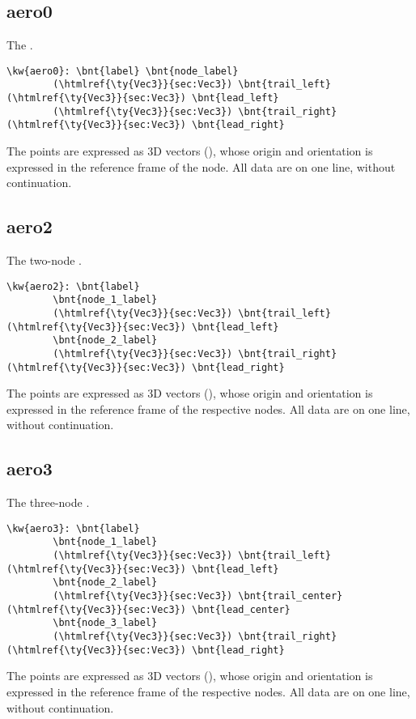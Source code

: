\subsection{aero0}
The .
\begin{Verbatim}[commandchars=\\\{\}]
    \kw{aero0}: \bnt{label} \bnt{node_label}
        (\htmlref{\ty{Vec3}}{sec:Vec3}) \bnt{trail_left} (\htmlref{\ty{Vec3}}{sec:Vec3}) \bnt{lead_left}
        (\htmlref{\ty{Vec3}}{sec:Vec3}) \bnt{trail_right} (\htmlref{\ty{Vec3}}{sec:Vec3}) \bnt{lead_right}
\end{Verbatim}
The points are expressed as 3D vectors (), whose origin and orientation
is expressed in the reference frame of the node.
All data are on one line, without continuation.

\subsection{aero2}
The two-node .
\begin{Verbatim}[commandchars=\\\{\}]
    \kw{aero2}: \bnt{label}
        \bnt{node_1_label}
        (\htmlref{\ty{Vec3}}{sec:Vec3}) \bnt{trail_left} (\htmlref{\ty{Vec3}}{sec:Vec3}) \bnt{lead_left}
        \bnt{node_2_label}
        (\htmlref{\ty{Vec3}}{sec:Vec3}) \bnt{trail_right} (\htmlref{\ty{Vec3}}{sec:Vec3}) \bnt{lead_right}
\end{Verbatim}
The points are expressed as 3D vectors (), whose origin and orientation
is expressed in the reference frame of the respective nodes.
All data are on one line, without continuation.

\subsection{aero3}
The three-node .
\begin{Verbatim}[commandchars=\\\{\}]
    \kw{aero3}: \bnt{label}
        \bnt{node_1_label}
        (\htmlref{\ty{Vec3}}{sec:Vec3}) \bnt{trail_left} (\htmlref{\ty{Vec3}}{sec:Vec3}) \bnt{lead_left}
        \bnt{node_2_label}
        (\htmlref{\ty{Vec3}}{sec:Vec3}) \bnt{trail_center} (\htmlref{\ty{Vec3}}{sec:Vec3}) \bnt{lead_center}
        \bnt{node_3_label}
        (\htmlref{\ty{Vec3}}{sec:Vec3}) \bnt{trail_right} (\htmlref{\ty{Vec3}}{sec:Vec3}) \bnt{lead_right}
\end{Verbatim}
The points are expressed as 3D vectors (), whose origin and orientation
is expressed in the reference frame of the respective nodes.
All data are on one line, without continuation.

